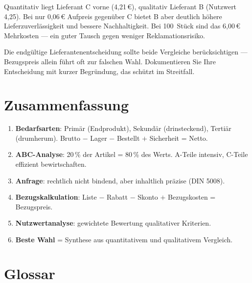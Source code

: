 \documentclass[11pt, a4paper]{article}
\begin{document}
Quantitativ liegt Lieferant C vorne (4{,}21\,€), qualitativ Lieferant B (Nutzwert 4{,}25).
Bei nur 0{,}06\,€ Aufpreis gegenüber C bietet B aber deutlich höhere Lieferzuverlässigkeit
und bessere Nachhaltigkeit. Bei 100~Stück sind das 6,00\,€ Mehrkosten --- ein guter
Tausch gegen weniger Reklamations­risiko.

\begin{merksatz}
Die endgültige Lieferantenentscheidung sollte beide Vergleiche berücksichtigen ---
Bezugspreis allein führt oft zur falschen Wahl. Dokumentieren Sie Ihre Entscheidung
mit kurzer Begründung, das schützt im Streitfall.
\end{merksatz}

\section{Zusammenfassung}

\begin{enumerate}
  \item \textbf{Bedarfsarten}: Primär (Endprodukt), Sekundär (drinsteckend), Tertiär (drumherum). Brutto $-$ Lager $-$ Bestellt $+$ Sicherheit = Netto.
  \item \textbf{ABC-Analyse}: 20\,\% der Artikel = 80\,\% des Werts. A-Teile intensiv, C-Teile effizient bewirtschaften.
  \item \textbf{Anfrage}: rechtlich nicht bindend, aber inhaltlich präzise (DIN 5008).
  \item \textbf{Bezugskalkulation}: Liste $-$ Rabatt $-$ Skonto $+$ Bezugskosten = Bezugspreis.
  \item \textbf{Nutzwertanalyse}: gewichtete Bewertung qualitativer Kriterien.
  \item \textbf{Beste Wahl} = Synthese aus quantitativem und qualitativem Vergleich.
\end{enumerate}

\newpage

\section*{Glossar}


\end{document}
